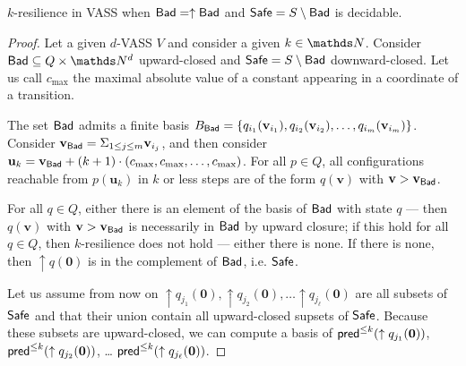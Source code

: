 \begin{proposition}
{\sc $k$-resilience } in VASS when $\textsf{Bad} = \uparrow \textsf{Bad}$ and $\textsf{Safe} = S \setminus \textsf{Bad}$ is decidable.
\end{proposition}


\begin{proof}
Let a given $d$-VASS $V$ and consider a given $k \in \N$.
Consider $\Bad \subseteq Q \times \N^d$ upward-closed and 
$\textsf{Safe} = S \setminus \textsf{Bad}$
 downward-closed.
Let us call $c_{\max}$ the maximal absolute value of a constant appearing in a coordinate of a transition.

The set $\textsf{Bad}$ admits a finite basis 
$B_{\textsf{Bad}} = \{ q_{i_1}(\textbf{v}_{i_1}), q_{i_2}(\textbf{v}_{i_2}), \ldots,
q_{i_m}(\textbf{v}_{i_m}) \}$.
Consider $\textbf{v}_{\textsf{Bad}} = \Sigma_{1 \leq j \leq m} \textbf{v}_{i_j}$,
and then consider 
$\textbf{u}_k = \textbf{v}_{\textsf{Bad}} + (k+1) \cdot (c_{\max}, c_{\max}, \ldots, c_{\max})$.
For all $p \in Q$, all configurations reachable from $p(\textbf{u}_k)$ in $k$ or less steps are 
of the form $q(\textbf{v})$ with $ \textbf{v} > \textbf{v}_{\textsf{Bad}}$.

For all $q \in Q$, either there is an element of the basis of $\textsf{Bad}$ with state $q$ \----
then $q(\textbf{v})$ with $\textbf{v} > \textbf{v}_{\textsf{Bad}}$ is necessarily in $\textsf{Bad}$ by upward closure; if this hold for all $q \in Q$, then $k$-resilience does not hold \---- either there is none. If there is none, then 
$\uparrow q(\textbf{0})$
 is in the complement of $\textsf{Bad}$, i.e. $\textsf{Safe}$.

Let us assume from now on 
 $\uparrow q_{j_1}(\textbf{0}), \uparrow q_{j_2}(\textbf{0}), \ldots \uparrow q_{j_\ell}(\textbf{0})$ are
all subsets of $\textsf{Safe}$ and that their union contain all upward-closed supsets of $\textsf{Safe}$.
Because these subsets are upward-closed, we can compute a basis of
$\textsf{pred}^{\leq k}(\uparrow q_{j_1}(\textbf{0}))$, $\textsf{pred}^{\leq k}(\uparrow q_{j_2}(\textbf{0}))$, \ldots
$\textsf{pred}^{\leq k}(\uparrow q_{j_\ell}(\textbf{0}))$.



\end{proof}
